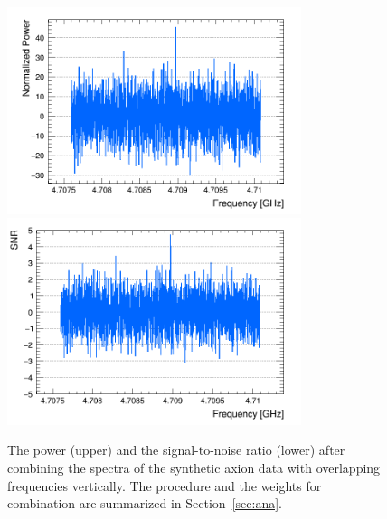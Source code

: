 \begin{figure}[htbp]                                                                                                  
    \centering                                                                                                                       
    \includegraphics[width=8.6cm]{figures/Power_CombSpectrum_FaxionRun_AllSteps_Rescan_SG4_W201.png}
    \includegraphics[width=8.6cm]{figures/SNR_CombSpectrum_FaxionRun_AllSteps_Rescan_SG4_W201.png}
    \caption{The power (upper) and the 
signal-to-noise ratio (lower) after combining the spectra 
of the synthetic axion data
with overlapping 
frequencies vertically. The procedure and the weights for combination 
are summarized in Section~\ref{sec:ana}.}                
\label{fig:faxioncombine}                                                                                                            
\end{figure}                       


